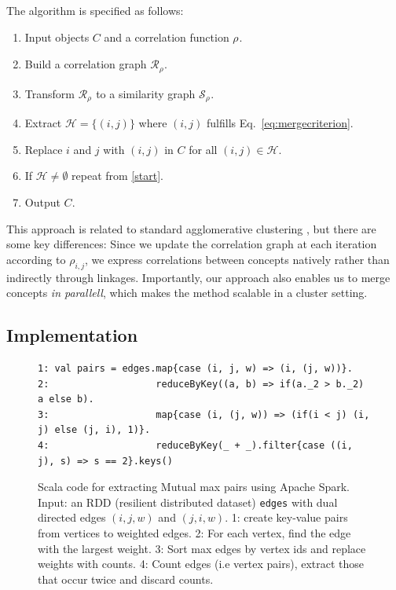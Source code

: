 \documentclass[conference]{IEEEtran}
\newcommand{\eq}[1]{Eq.\ \ref{#1}}
\newcommand{\rn}[1]{\rho_{#1}}
\begin{document}
The algorithm is specified as follows:
\begin{enumerate}
\item Input objects $C$ and a correlation function $\rn{}$.
\item \label{start} Build a correlation graph $\mathcal{R}_{\rn{}}$.
\item Transform $\mathcal{R}_{\rn{}}$ to a similarity graph $\mathcal{S}_{\rn{}}$.
\item Extract $\mathcal{H} = \{(i, j)\}$ where $(i, j)$ fulfills \eq{eq:mergecriterion}.
\item Replace $i$ and $j$ with $(i, j)$ in $C$ for all $(i, j) \in \mathcal{H}$.
\item If $ \mathcal{H} \neq \emptyset$ repeat from \ref{start}.
\item Output $C$.
\end{enumerate}

This approach is related to standard agglomerative clustering \cite{Sibson73}, but there are some key differences: 
Since we update the correlation graph at each iteration according to $\rn{i,j}$, we express correlations between 
concepts natively rather than indirectly through linkages. Importantly, our approach also enables us to merge 
concepts \emph{in parallell}, which makes the method scalable in a cluster setting.

\subsection{Implementation}
\label{subsec:implementation}

\begin{figure}
\begin{lstlisting}
1: val pairs = edges.map{case (i, j, w) => (i, (j, w))}.
2:                   reduceByKey((a, b) => if(a._2 > b._2) a else b).
3:                   map{case (i, (j, w)) => (if(i < j) (i, j) else (j, i), 1)}.
4:                   reduceByKey(_ + _).filter{case ((i, j), s) => s == 2}.keys()
\end{lstlisting}
\caption{Scala code for extracting Mutual max pairs using Apache Spark. Input: an RDD (resilient distributed dataset) \texttt{edges} 
with dual directed edges $(i,j,w)$ and $(j,i,w)$. 1: create key-value pairs from vertices to weighted edges. 2: For each vertex, 
find the edge with the largest weight. 3: Sort max edges by vertex ids and replace weights with counts. 4: Count edges 
(i.e vertex pairs), extract those that occur twice and discard counts.}
\label{fig:code}
\end{figure}
\end{document}

